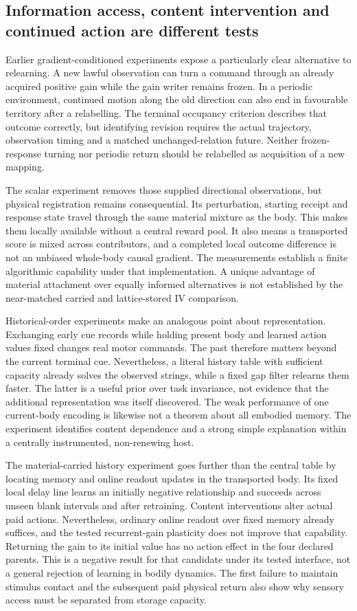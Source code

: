\subsection*{Information access, content intervention and continued action are different tests}

Earlier gradient-conditioned experiments expose a particularly clear alternative to relearning. A new lawful observation can turn a command through an already acquired positive gain while the gain writer remains frozen. In a periodic environment, continued motion along the old direction can also end in favourable territory after a relabelling. The terminal occupancy criterion describes that outcome correctly, but identifying revision requires the actual trajectory, observation timing and a matched unchanged-relation future. Neither frozen-response turning nor periodic return should be relabelled as acquisition of a new mapping.

The scalar experiment removes those supplied directional observations, but physical registration remains consequential. Its perturbation, starting receipt and response state travel through the same material mixture as the body. This makes them locally available without a central reward pool. It also means a transported score is mixed across contributors, and a completed local outcome difference is not an unbiased whole-body causal gradient. The measurements establish a finite algorithmic capability under that implementation. A unique advantage of material attachment over equally informed alternatives is not established by the near-matched carried and lattice-stored IV comparison.

Historical-order experiments make an analogous point about representation. Exchanging early cue records while holding present body and learned action values fixed changes real motor commands. The past therefore matters beyond the current terminal cue. Nevertheless, a literal history table with sufficient capacity already solves the observed strings, while a fixed gap filter relearns them faster. The latter is a useful prior over task invariance, not evidence that the additional representation was itself discovered. The weak performance of one current-body encoding is likewise not a theorem about all embodied memory. The experiment identifies content dependence and a strong simple explanation within a centrally instrumented, non-renewing host.

The material-carried history experiment goes further than the central table by locating memory and online readout updates in the transported body. Its fixed local delay line learns an initially negative relationship and succeeds across unseen blank intervals and after retraining. Content interventions alter actual paid actions. Nevertheless, ordinary online readout over fixed memory already suffices, and the tested recurrent-gain plasticity does not improve that capability. Returning the gain to its initial value has no action effect in the four declared parents. This is a negative result for that candidate under its tested interface, not a general rejection of learning in bodily dynamics. The first failure to maintain stimulus contact and the subsequent paid physical return also show why sensory access must be separated from storage capacity.

